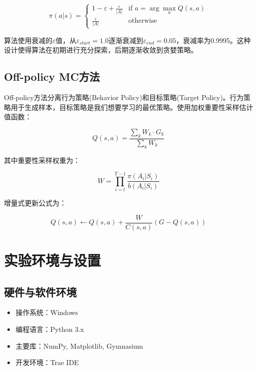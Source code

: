 \documentclass[12pt,a4paper]{article}
\begin{document}
\begin{equation}
\pi(a|s) = \begin{cases}
1 - \varepsilon + \frac{\varepsilon}{|A|} & \text{if } a = \arg\max_a Q(s,a) \\
\frac{\varepsilon}{|A|} & \text{otherwise}
\end{cases}
\end{equation}

算法使用衰减的$\varepsilon$值，从$\varepsilon_{start}=1.0$逐渐衰减到$\varepsilon_{end}=0.05$，衰减率为0.9995。这种设计使得算法在初期进行充分探索，后期逐渐收敛到贪婪策略。

\subsection{Off-policy MC方法}

Off-policy方法分离行为策略(Behavior Policy)和目标策略(Target Policy)。行为策略用于生成样本，目标策略是我们想要学习的最优策略。使用加权重要性采样估计值函数：

\begin{equation}
Q(s,a) = \frac{\sum_k W_k \cdot G_k}{\sum_k W_k}
\end{equation}

其中重要性采样权重为：

\begin{equation}
W = \prod_{i=t}^{T-1} \frac{\pi(A_i|S_i)}{b(A_i|S_i)}
\end{equation}

增量式更新公式为：

\begin{equation}
Q(s,a) \leftarrow Q(s,a) + \frac{W}{C(s,a)}(G - Q(s,a))
\end{equation}

\section{实验环境与设置}

\subsection{硬件与软件环境}

\begin{itemize}
    \item 操作系统：Windows
    \item 编程语言：Python 3.x
    \item 主要库：NumPy, Matplotlib, Gymnasium
    \item 开发环境：Trae IDE
\end{itemize}
\end{document}

